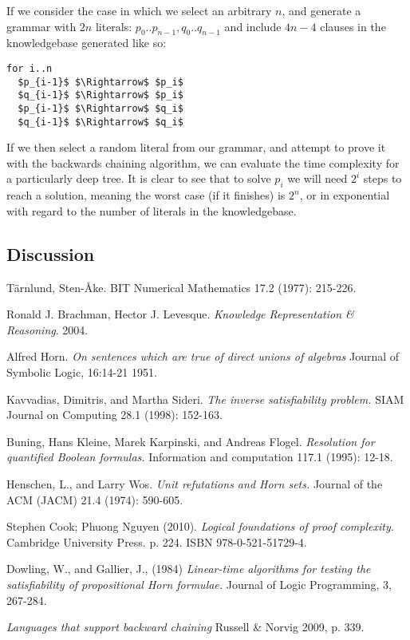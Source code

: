 \documentclass{article}
\begin{document}
If we consider the case in which we select an arbitrary $n$, and generate a grammar 
with $2n$ literals: $p_0 .. p_{n-1}, q_0 .. q_{n-1}$ and include $4n-4$ clauses in the knowledgebase
generated like so:

\begin{lstlisting}[mathescape=true]
for i..n
  $p_{i-1}$ $\Rightarrow$ $p_i$
  $q_{i-1}$ $\Rightarrow$ $p_i$
  $p_{i-1}$ $\Rightarrow$ $q_i$
  $q_{i-1}$ $\Rightarrow$ $q_i$
\end{lstlisting}

If we then select a random literal from our grammar, and attempt to prove it
with the backwards chaining algorithm, we can evaluate the time complexity for a
particularly deep tree. It is clear to see that to solve $p_i$ we will need $2^i$ 
steps to reach a solution, meaning the worst case (if it finishes) is $2^n$, or
in exponential with regard to the number of literals in the knowledgebase.

\subsection{Discussion}

\begin{thebibliography}{9}

  Tärnlund, Sten-Åke.
  \cite{Horn clause computability.} 
  BIT Numerical Mathematics 17.2 (1977): 215-226.

  Ronald J. Brachman, Hector J. Levesque.
  \emph{Knowledge Representation \& Reasoning}.
  2004.

  Alfred Horn.
  \emph{On sentences which are true of direct unions of algebras}
  Journal of Symbolic Logic, 16:14-21
  1951.

  Kavvadias, Dimitris, and Martha Sideri. 
  \emph{The inverse satisfiability problem.}
  SIAM Journal on Computing 28.1 (1998): 152-163.

  Buning, Hans Kleine, Marek Karpinski, and Andreas Flogel. 
  \emph{Resolution for quantified Boolean formulas.} 
  Information and computation 117.1 (1995): 12-18.

  Henschen, L., and Larry Wos. 
  \emph{Unit refutations and Horn sets.} 
  Journal of the ACM (JACM) 21.4 (1974): 590-605.

  Stephen Cook; Phuong Nguyen (2010). 
  \emph{Logical foundations of proof complexity.}
  Cambridge University Press. p. 224. ISBN 978-0-521-51729-4.

  Dowling, W., and Gallier, J., (1984) 
  \emph{Linear-time algorithms for testing the satisfiability of propositional Horn formulae.}
  Journal of Logic Programming, 3, 267-284.

  \emph{Languages that support backward chaining}
  Russell \& Norvig 2009, p. 339.


\end{thebibliography}
\end{document}
